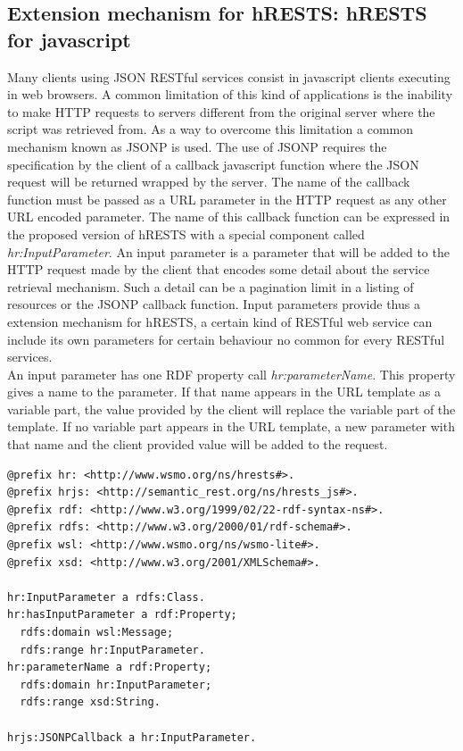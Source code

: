 \subsection{Extension mechanism for hRESTS: hRESTS for javascript}
Many clients using JSON RESTful services consist in javascript clients executing in web browsers. A common limitation of this kind of applications is the inability to make HTTP requests to servers different from the original server where the script was retrieved from. As a way to overcome this limitation a common mechanism known as JSONP is used. The use of JSONP requires the specification by the client of a callback javascript function where the JSON request will be returned wrapped by the server. The name of the callback function must be passed as a URL parameter in the HTTP request as any other URL encoded parameter.  The name of this callback function can be expressed in the proposed version of hRESTS with a special component called \emph{hr:InputParameter}. An input parameter  is a parameter that will be added to the HTTP request made by the client that encodes some detail about the service retrieval mechanism. Such a detail can be a pagination limit in a listing of resources or the JSONP callback function. Input parameters provide thus a extension mechanism for hRESTS, a certain kind of RESTful web service can include its own parameters for certain behaviour no common for every RESTful services.\\
An input parameter has one RDF property call \emph{hr:parameterName}. This property gives a name to the parameter. If that name appears in the URL template as a variable part, the value provided by the client will replace the variable part of the template. If no variable part appears in the URL template, a new parameter with that name and the client provided value will be added to the request. 
\vspace{5 mm}
\begin{lstlisting}
@prefix hr: <http://www.wsmo.org/ns/hrests#>. 
@prefix hrjs: <http://semantic_rest.org/ns/hrests_js#>. 
@prefix rdf: <http://www.w3.org/1999/02/22-rdf-syntax-ns#>. 
@prefix rdfs: <http://www.w3.org/2000/01/rdf-schema#>. 
@prefix wsl: <http://www.wsmo.org/ns/wsmo-lite#>. 
@prefix xsd: <http://www.w3.org/2001/XMLSchema#>. 

hr:InputParameter a rdfs:Class.
hr:hasInputParameter a rdf:Property;
  rdfs:domain wsl:Message;
  rdfs:range hr:InputParameter.
hr:parameterName a rdf:Property;
  rdfs:domain hr:InputParameter;
  rdfs:range xsd:String.

hrjs:JSONPCallback a hr:InputParameter.
\end{lstlisting} \vspace{5 mm}

